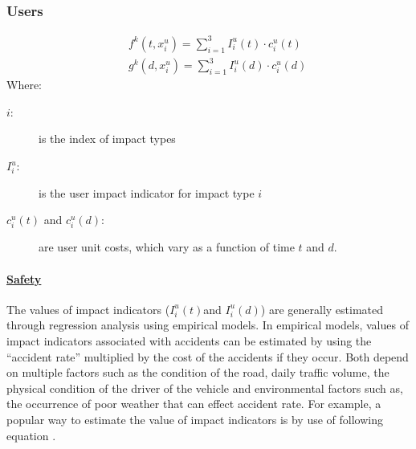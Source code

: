 \subsubsection{Users}
\begin{eqnarray}
      && f_{}^k(t,x_i^u) = \sum\limits_{i = 1}^3 {I_i^u(t) \cdot c_i^u(t)} \label{fx2}\\
      && g_{}^k(d,x_i^u) = \sum\limits_{i = 1}^3 {I_i^u(d) \cdot c_i^u(d)} \label{gx2}
\end{eqnarray}
Where:
\begin{adjustwidth}{1cm}{}
\begin{description}
\item[$i$:] is the index of impact types
\item[$I_i^u$:] is the user impact indicator for impact type $i$ 
\item[$c_i^u(t)$ and $c_i^u(d)$:] are user unit costs, which vary as a function of time $t$ and $d$.
\end{description}
\end{adjustwidth}
\paragraph{\underline{Safety}}
The values of impact indicators ($I_i^u(t)$and $I_i^u(d)$) are generally estimated through regression analysis using empirical models. In empirical models, values of impact indicators associated with accidents can be estimated by using the ``accident rate'' multiplied by the cost of the accidents if they occur. Both depend on multiple factors such as the condition of the road, daily traffic volume, the physical condition of the driver of the vehicle and environmental factors such as, the occurrence of poor weather that can effect accident rate. For example, a popular way to estimate the value of impact indicators is by use of following equation \citep{Lindenmann2008}.


